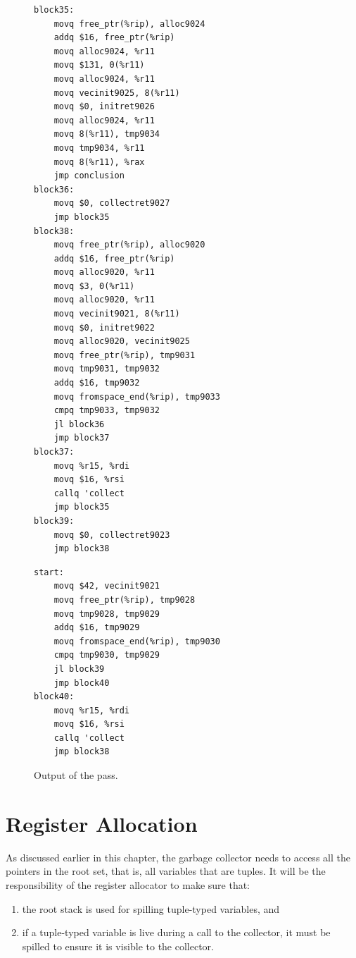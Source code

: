 \documentclass[7x10,nocrop]{TimesAPriori_MIT}%
\begin{document}
\begin{figure}[tbp]
\centering
\begin{minipage}[t]{0.5\textwidth}
\begin{lstlisting}[basicstyle=\ttfamily\scriptsize]
block35:
    movq free_ptr(%rip), alloc9024
    addq $16, free_ptr(%rip)
    movq alloc9024, %r11
    movq $131, 0(%r11)
    movq alloc9024, %r11
    movq vecinit9025, 8(%r11)
    movq $0, initret9026
    movq alloc9024, %r11
    movq 8(%r11), tmp9034
    movq tmp9034, %r11
    movq 8(%r11), %rax
    jmp conclusion
block36:
    movq $0, collectret9027
    jmp block35
block38:
    movq free_ptr(%rip), alloc9020
    addq $16, free_ptr(%rip)
    movq alloc9020, %r11
    movq $3, 0(%r11)
    movq alloc9020, %r11
    movq vecinit9021, 8(%r11)
    movq $0, initret9022
    movq alloc9020, vecinit9025
    movq free_ptr(%rip), tmp9031
    movq tmp9031, tmp9032
    addq $16, tmp9032
    movq fromspace_end(%rip), tmp9033
    cmpq tmp9033, tmp9032
    jl block36
    jmp block37
block37:
    movq %r15, %rdi
    movq $16, %rsi
    callq 'collect
    jmp block35
block39:
    movq $0, collectret9023
    jmp block38
\end{lstlisting}
\end{minipage}
\begin{minipage}[t]{0.45\textwidth}
\begin{lstlisting}[basicstyle=\ttfamily\scriptsize]
start:
    movq $42, vecinit9021
    movq free_ptr(%rip), tmp9028
    movq tmp9028, tmp9029
    addq $16, tmp9029
    movq fromspace_end(%rip), tmp9030
    cmpq tmp9030, tmp9029
    jl block39
    jmp block40
block40:
    movq %r15, %rdi
    movq $16, %rsi
    callq 'collect
    jmp block38
\end{lstlisting}
\end{minipage}
\caption{Output of the  pass.}
\label{fig:select-instr-output-gc}
\end{figure}

\clearpage

\section{Register Allocation}
\label{sec:reg-alloc-gc}

As discussed earlier in this chapter, the garbage collector needs to
access all the pointers in the root set, that is, all variables that
are tuples. It will be the responsibility of the register allocator
to make sure that:
\begin{enumerate}
\item the root stack is used for spilling tuple-typed variables, and
\item if a tuple-typed variable is live during a call to the
  collector, it must be spilled to ensure it is visible to the
  collector.
\end{enumerate}
\end{document}
